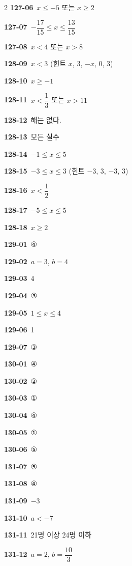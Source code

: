 \documentclass[10pt,a4paper]{article}
\begin{document}
\begin{multicols}{2}
\noindent\textbf{127-06}\ $x\le -5$ 또는 $x\ge 2$\par
\noindent\textbf{127-07}\ $-\dfrac{17}{15}\le x\le \dfrac{13}{15}$\par
\noindent\textbf{127-08}\ $x<4$ 또는 $x>8$\par
\noindent\textbf{128-09}\ $x<3$ (힌트 $x$, $3$, $-x$, $0$, $3$)\par
\noindent\textbf{128-10}\ $x\ge -1$\par
\noindent\textbf{128-11}\ $x<\dfrac{1}{3}$ 또는 $x>11$\par
\noindent\textbf{128-12}\ 해는 없다.\par
\noindent\textbf{128-13}\ 모든 실수\par
\noindent\textbf{128-14}\ $-1\le x\le 5$\par
\noindent\textbf{128-15}\ $-3\le x\le 3$ (힌트 $-3$, $3$, $-3$, $3$)\par
\noindent\textbf{128-16}\ $x<\dfrac{1}{2}$\par
\noindent\textbf{128-17}\ $-5\le x\le 5$\par
\noindent\textbf{128-18}\ $x\ge 2$\par
\noindent\textbf{129-01}\ ④\par
\noindent\textbf{129-02}\ $a=3$, $b=4$\par
\noindent\textbf{129-03}\ 4\par
\noindent\textbf{129-04}\ ③\par
\noindent\textbf{129-05}\ $1\le x\le 4$\par
\noindent\textbf{129-06}\ 1\par
\noindent\textbf{129-07}\ ③\par
\noindent\textbf{130-01}\ ④\par
\noindent\textbf{130-02}\ ②\par
\noindent\textbf{130-03}\ ①\par
\noindent\textbf{130-04}\ ④\par
\noindent\textbf{130-05}\ ①\par
\noindent\textbf{130-06}\ ⑤\par
\noindent\textbf{131-07}\ ⑤\par
\noindent\textbf{131-08}\ ④\par
\noindent\textbf{131-09}\ $-3$\par
\noindent\textbf{131-10}\ $a<-7$\par
\noindent\textbf{131-11}\ 21명 이상 24명 이하\par
\noindent\textbf{131-12}\ $a=2$, $b=\dfrac{10}{3}$\par

\end{multicols}
\end{document}
